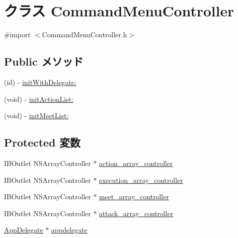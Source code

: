 \hypertarget{interface_command_menu_controller}{\section{クラス Command\-Menu\-Controller}
\label{interface_command_menu_controller}
}


{\ttfamily \#import $<$Command\-Menu\-Controller.\-h$>$}

\subsection*{Public メソッド}
\begin{DoxyCompactItemize}
\item 
(id) -\/ \hyperlink{interface_command_menu_controller_a9af6e70f440918e6ed332f999a100e69}{init\-With\-Delegate\-:}
\item 
(void) -\/ \hyperlink{interface_command_menu_controller_a490772ef3df650c7fa4a9fda4cdaf9d8}{init\-Action\-List\-:}
\item 
(void) -\/ \hyperlink{interface_command_menu_controller_accfe2ed84d278c6296bafc268f440356}{init\-Meet\-List\-:}
\end{DoxyCompactItemize}
\subsection*{Protected 変数}
\begin{DoxyCompactItemize}
\item 
I\-B\-Outlet N\-S\-Array\-Controller $\ast$ \hyperlink{interface_command_menu_controller_a28bc90598ef375243ad6b41e09f69a86}{action\-\_\-array\-\_\-controller}
\item 
I\-B\-Outlet N\-S\-Array\-Controller $\ast$ \hyperlink{interface_command_menu_controller_ab2cd2691114ed258bbb87d9febf1ccf2}{execution\-\_\-array\-\_\-controller}
\item 
I\-B\-Outlet N\-S\-Array\-Controller $\ast$ \hyperlink{interface_command_menu_controller_a8a78852fe06f58855cc22b7bd5a3a5b3}{meet\-\_\-array\-\_\-controller}
\item 
I\-B\-Outlet N\-S\-Array\-Controller $\ast$ \hyperlink{interface_command_menu_controller_a8cb94ac214d46ebe9581afd5c3ebb05b}{attack\-\_\-array\-\_\-controller}
\item 
\hyperlink{interface_app_delegate}{App\-Delegate} $\ast$ \hyperlink{interface_command_menu_controller_a049b73f385d9413ab4bacea41e26e737}{appdelegate}
\end{DoxyCompactItemize}


